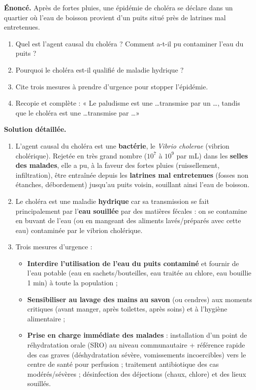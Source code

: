 \documentclass[11pt]{article}
\begin{document}
\begin{exoresolu}
\textbf{Énoncé.} Après de fortes pluies, une épidémie de choléra se déclare dans un quartier où l'eau de boisson provient d'un puits situé près de latrines mal entretenues.
\begin{enumerate}
\item Quel est l'agent causal du choléra ? Comment a-t-il pu contaminer l'eau du puits ?
\item Pourquoi le choléra est-il qualifié de maladie hydrique ?
\item Cite trois mesures à prendre d'urgence pour stopper l'épidémie.
\item Recopie et complète : « Le paludisme est une \ldots transmise par un \ldots, tandis que le choléra est une \ldots transmise par \ldots »
\end{enumerate}
\tcblower
\textbf{Solution détaillée.}
\begin{enumerate}
\item L'agent causal du choléra est une \textbf{bactérie}, le \emph{Vibrio cholerae} (vibrion cholérique). Rejetée en très grand nombre ($10^7$ à $10^9$ par mL) dans les \textbf{selles des malades}, elle a pu, à la faveur des fortes pluies (ruissellement, infiltration), être entraînée depuis les \textbf{latrines mal entretenues} (fosses non étanches, débordement) jusqu'au puits voisin, souillant ainsi l'eau de boisson.
\item Le choléra est une maladie \textbf{hydrique} car sa transmission se fait principalement par l'\textbf{eau souillée} par des matières fécales : on se contamine en buvant de l'eau (ou en mangeant des aliments lavés/préparés avec cette eau) contaminée par le vibrion cholérique.
\item Trois mesures d'urgence :
\begin{itemize}
\item \textbf{Interdire l'utilisation de l'eau du puits contaminé} et fournir de l'eau potable (eau en sachets/bouteilles, eau traitée au chlore, eau bouillie 1 min) à toute la population ;
\item \textbf{Sensibiliser au lavage des mains au savon} (ou cendres) aux moments critiques (avant manger, après toilettes, après soins) et à l'hygiène alimentaire ;
\item \textbf{Prise en charge immédiate des malades} : installation d'un point de réhydratation orale (SRO) au niveau communautaire + référence rapide des cas graves (déshydratation sévère, vomissements incoercibles) vers le centre de santé pour perfusion ; traitement antibiotique des cas modérés/sévères ; désinfection des déjections (chaux, chlore) et des lieux souillés.

\end{itemize}
\end{enumerate}
\end{exoresolu}
\end{document}
